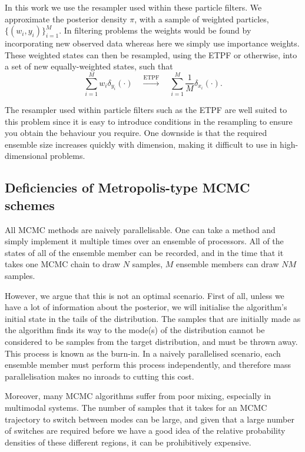 \documentclass[final]{siamltex}
\begin{document}
In this work we use the resampler used within these particle filters. We
approximate the posterior {\red density $\pi$,} with a sample
of weighted particles, $\{(w_i,y_i)\}_{i=1}^M$. In filtering problems
the weights would be found by incorporating new observed data whereas
here we simply use importance weights. These weighted states can then be resampled, using the ETPF or otherwise,
into a {\red set of new equally-weighted states, such that
\begin{equation}\label{eqn:resampler}
	\sum\limits_{i=1}^M \! w_i\delta_{y_i}(\cdot)
	 \quad \xrightarrow{\text{ETPF}} \quad \sum\limits_{i=1}^M \!
	 \frac{1}{M} \delta_{x_i}(\cdot).
\end{equation}}

The resampler used within particle filters such as the ETPF are well suited to this problem
since it is easy to introduce conditions in the resampling to ensure
you obtain the behaviour you require. One downside is that the
required ensemble size increases quickly with dimension, making it
difficult to use in high-dimensional problems.


\subsection{Deficiencies of Metropolis-type MCMC schemes}
All MCMC methods are naively parallelisable. One can take a method
and simply implement it multiple times over an ensemble of processors. All
of the states of all of the ensemble member can be recorded, and in the time
that it takes one MCMC chain to draw $N$ samples, $M$ ensemble members
can draw $NM$ samples. 

However, we argue that this is not an optimal
scenario. First of all, unless we have a lot of information about the
posterior, we will initialise the algorithm's initial state in the
tails of the distribution. The samples that are initially made as the
algorithm finds its way to the mode(s) of the distribution cannot be
considered to be samples from the target distribution, and must be thrown
away. This process is known as the burn-in. In a naively parallelised
scenario, each ensemble member must perform this process independently,
and therefore mass parallelisation makes no inroads to cutting this cost.

Moreover, many MCMC algorithms suffer from poor mixing, especially in
multimodal systems. The number of samples that it takes for an MCMC
trajectory to switch between modes can be large, and given that a large
number of switches are required before we have a good idea of the relative
probability densities of these different regions, it can be prohibitively
expensive.
\end{document}
